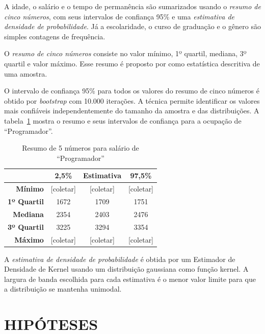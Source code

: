 \documentclass[12pt,a4paper]{article}
\theoremstyle{hypo}
\begin{document}
A idade, o salário e o tempo de permanência são sumarizados usando o \textit{resumo de cinco números}, com seus intervalos de confiança 95\% e uma \textit{estimativa de densidade de probabilidade}. Já a escolaridade, o curso de graduação e o gênero são simples contagens de frequência.

O \textit{resumo de cinco números} consiste no valor mínimo, 1º quartil, mediana, 3º quartil e valor máximo. Esse resumo é proposto por  como estatística descritiva de uma amostra.

O intervalo de confiança 95\% para todos os valores do resumo de cinco números é obtido por \textit{bootstrap} com 10.000 iterações. A técnica permite identificar os valores mais confiáveis independentemente do tamanho da amostra e das distribuições. A tabela~\ref{tab:resumo-salario-programador} mostra o resumo e seus intervalos de confiança para a ocupação de \enquote{Programador}.

\begin{table}[htb]
\centering
\begin{tabular}{r|c|c|c}
                    & \textbf{2,5\%} & \textbf{Estimativa} & \textbf{97,5\%} \\ \hline
\textbf{Mínimo}     & [coletar]      & [coletar]           & [coletar] \\ \hline
\textbf{1º Quartil} & 1672           & 1709                & 1751 \\ \hline
\textbf{Mediana}    & 2354           & 2403                & 2476 \\ \hline
\textbf{3º Quartil} & 3225           & 3294                & 3354 \\ \hline
\textbf{Máximo}     & [coletar]      & [coletar]           & [coletar]    
\end{tabular}
\caption{Resumo de 5 números para salário de \enquote{Programador}}
\label{tab:resumo-salario-programador}
\end{table}

A \textit{estimativa de densidade de probabilidade} é obtida por um Estimador de Densidade de Kernel usando um distribuição gaussiana como função kernel. A largura de banda escolhida para cada estimativa é o menor valor limite para que a distribuição se mantenha unimodal.

\section{HIPÓTESES}

\end{document}
